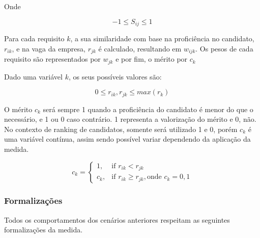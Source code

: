 \documentclass[preprint,12pt]{elsarticle}
\begin{document}
Onde

\begin{equation}
-1 \leq S_{ij} \leq 1
\end{equation}

Para cada requisito $k$, a sua similaridade com base na proficiência no candidato, $r_{ik}$, e na vaga da empresa, $r_{jk}$ é calculado, resultando em $w_{ijk}$. Os pesos de cada requisito são representados por $w_{jk}$ e por fim, o mérito por $c_k$


Dado uma variável $k$, os seus possíveis valores são:

\begin{equation}
0 \leq r_{ik}, r_{jk} \leq max(r_k)
\end{equation}

O mérito $c_{k}$ será sempre 1 quando a proficiência do candidato é menor do que o necessário, e 1 ou 0 caso contrário. 1 representa a valorização do mérito e 0, não. No contexto de ranking de candidatos, somente será utilizado 1 e 0, porém $c_{k}$ é uma variável contínua, assim sendo possível variar dependendo da aplicação da medida.

\begin{equation}
c_{k} = \begin{cases} 1, & \text{if } r_{ik} < r_{jk} \\ c_{k}, & \text{if } r_{ik} \geq r_{jk}, \text{onde } c_k = 0, 1 \end{cases}
\end{equation}

\subsubsection{Formalizações}

Todos os comportamentos dos cenários anteriores respeitam as seguintes formalizações da medida.
\end{document}
